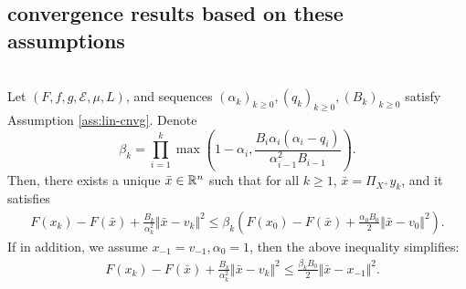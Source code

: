 \documentclass[12pt]{article}
\begin{document}
    \subsection{convergence results based on these assumptions}
            \begin{theorem}\;\label{thm:cnvg-generic-seq}\\
                Let $(F, f, g, \mathcal E, \mu, L)$, and sequences $(\alpha_k)_{k \ge 0}, (q_k)_{k \ge 0}, (B_k)_{k \ge 0}$ 
                satisfy Assumption \ref{ass:lin-cnvg}. 
                Denote 
                $$
                    \beta_k = \prod_{i = 1}^k\max\left(
                        1 - \alpha_i, 
                        \frac{B_i\alpha_i(\alpha_i - q_i)}{\alpha_{i - 1}^2B_{i - 1}}
                    \right). 
                $$
                Then, there exists a unique $\bar x \in \mathbb R^n$ such that for all $k \ge 1$, $\bar x = \Pi_{X^+}y_k$, and it satisfies
                \begin{align*}
                    F(x_k) - F(\bar x) + \frac{B_k}{\alpha_k^2}\Vert \bar x - v_k\Vert^2 
                    \le 
                    \beta_k\left(
                        F(x_0) - F(\bar x) + \frac{\alpha_0B_0}{2}\Vert \bar x - v_0\Vert^2
                    \right). 
                \end{align*}
                If in addition, we assume $x_{-1} = v_{-1}, \alpha_0 = 1$, then the above inequality simplifies: 
                \begin{align*}
                    & F(x_k) - F(\bar x) + \frac{B_k}{\alpha_k^2}\Vert \bar x - v_k\Vert^2 \le 
                    \frac{\beta_kB_0}{2}\Vert \bar x - x_{-1}\Vert^2.
                \end{align*}
            \end{theorem}
\end{document}

